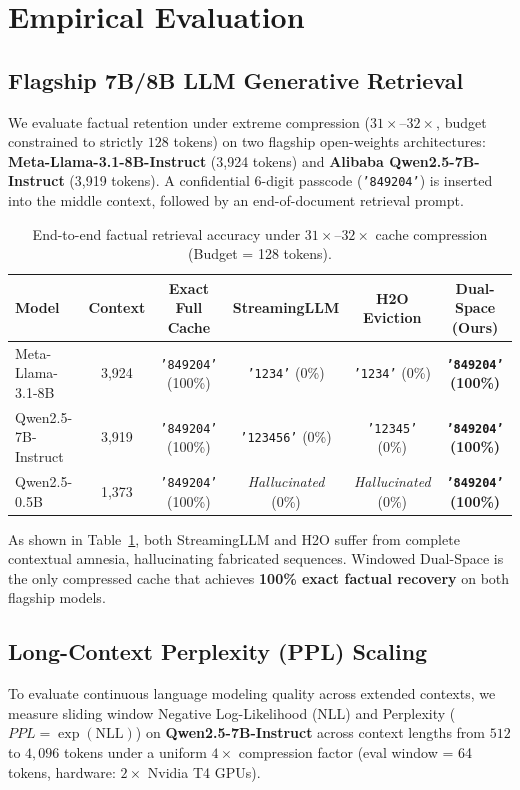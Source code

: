 \documentclass[11pt,a4paper]{article}
\begin{document}
\section{Empirical Evaluation}

\subsection{Flagship 7B/8B LLM Generative Retrieval}
We evaluate factual retention under extreme compression ($31\times$--$32\times$, budget constrained to strictly $128$ tokens) on two flagship open-weights architectures: \textbf{Meta-Llama-3.1-8B-Instruct} (3,924 tokens) and \textbf{Alibaba Qwen2.5-7B-Instruct} (3,919 tokens). A confidential 6-digit passcode (\texttt{'849204'}) is inserted into the middle context, followed by an end-of-document retrieval prompt.

\begin{table}[h]
\centering
\small
\caption{End-to-end factual retrieval accuracy under $31\times$--$32\times$ cache compression (Budget = 128 tokens).}
\label{tab:retrieval_7b}
\begin{tabular}{lccccc}
\toprule
\textbf{Model} & \textbf{Context} & \textbf{Exact Full Cache} & \textbf{StreamingLLM} & \textbf{H2O Eviction} & \textbf{Dual-Space (Ours)} \\
\midrule
Meta-Llama-3.1-8B & 3,924 & \texttt{'849204'} (100\%) & \texttt{'1234'} (0\%) & \texttt{'1234'} (0\%) & \textbf{\texttt{'849204'} (100\%)} \\
Qwen2.5-7B-Instruct & 3,919 & \texttt{'849204'} (100\%) & \texttt{'123456'} (0\%) & \texttt{'12345'} (0\%) & \textbf{\texttt{'849204'} (100\%)} \\
Qwen2.5-0.5B & 1,373 & \texttt{'849204'} (100\%) & \textit{Hallucinated} (0\%) & \textit{Hallucinated} (0\%) & \textbf{\texttt{'849204'} (100\%)} \\
\bottomrule
\end{tabular}
\end{table}

As shown in Table~\ref{tab:retrieval_7b}, both StreamingLLM and H2O suffer from complete contextual amnesia, hallucinating fabricated sequences. Windowed Dual-Space is the only compressed cache that achieves \textbf{100\% exact factual recovery} on both flagship models.

\subsection{Long-Context Perplexity (PPL) Scaling}
To evaluate continuous language modeling quality across extended contexts, we measure sliding window Negative Log-Likelihood (NLL) and Perplexity ($PPL = \exp(\text{NLL})$) on \textbf{Qwen2.5-7B-Instruct} across context lengths from $512$ to $4,096$ tokens under a uniform $4\times$ compression factor (eval window = 64 tokens, hardware: $2\times$ Nvidia T4 GPUs).
\end{document}
